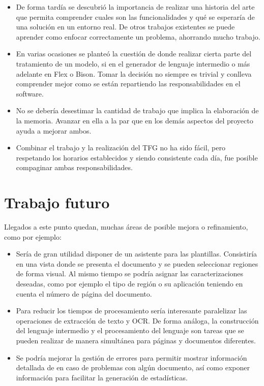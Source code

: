 \begin{itemize}
	\item De forma tardía se descubrió la importancia de realizar una historia del arte que permita comprender cuales son las funcionalidades y qué se esperaría de una solución en un entorno real. De otros trabajos existentes se puede aprender como enfocar correctamente un problema, ahorrando mucho trabajo.
	\item En varias ocasiones se planteó la cuestión de donde realizar cierta parte del tratamiento de un modelo, si en el generador de lenguaje intermedio o más adelante en Flex o Bison. Tomar la decisión no siempre es trivial y conlleva comprender mejor como se están repartiendo las responsabilidades en el software.
	\item No se debería desestimar la cantidad de trabajo que implica la elaboración de la memoria. Avanzar en ella a la par que en los demás aspectos del proyecto ayuda a mejorar ambos.
	\item Combinar el trabajo y la realización del TFG no ha sido fácil, pero respetando los horarios establecidos y siendo consistente cada día, fue posible compaginar ambas responsabilidades.
\end{itemize}

\section{Trabajo futuro}

Llegados a este punto quedan, muchas áreas de posible mejora o refinamiento, como por ejemplo:

\begin{itemize}
	\item Sería de gran utilidad disponer de un asistente para las plantillas. Consistiría en una vista donde se presenta el documento y se pueden seleccionar regiones de forma visual. Al mismo tiempo se podría asignar las caracterizaciones deseadas, como por ejemplo el tipo de región o su aplicación teniendo en cuenta el número de página del documento.
	\item Para reducir los tiempos de procesamiento sería interesante paralelizar las operaciones de extracción de texto y OCR. De forma análoga, la construcción del lenguaje intermedio y el procesamiento del lenguaje son tareas que se pueden realizar de manera simultánea para páginas y documentos diferentes.
	\item Se podría mejorar la gestión de errores para permitir mostrar información detallada de en caso de problemas con algún documento, así como exponer información para facilitar la generación de estadísticas.
\end{itemize}
